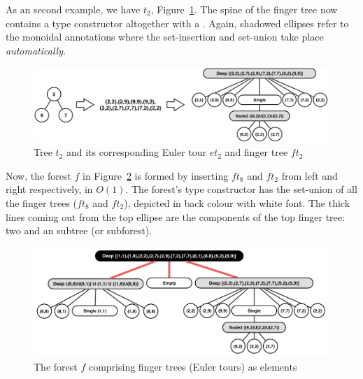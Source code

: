 As an second example, we have $t_2$, Figure~\ref{fig:t2et2ft2}. The spine of the finger tree now contains a  type constructor altogether with a . Again, shadowed ellipses refer to the monoidal annotations  where the set-insertion and set-union take place \textit{automatically}.
\begin{figure}
\begin{center}
\includegraphics[scale=0.35]{./Images/t2et2ft2} 
\end{center}
\caption{Tree $t_2$ and its corresponding Euler tour $et_2$ and finger tree $ft_2$}
\label{fig:t2et2ft2}
\end{figure}

Now, the forest $f$ in Figure~\ref{fig:forest} is formed by inserting $ft_8$ and $ft_2$ from left and right respectively, in $O(1)$. The forest's  type constructor has the set-union of all the finger trees ($ft_8$ and $ft_2$), depicted in back colour with white font. The thick lines coming out from the top ellipse are the components of the top finger tree: two  and an  subtree (or subforest).
\begin{figure}
\begin{center}
\includegraphics[scale=0.35]{./Images/forest} 
\end{center}
\caption{The forest $f$ comprising finger trees (Euler tours) as elements}
\label{fig:forest}
\end{figure}

